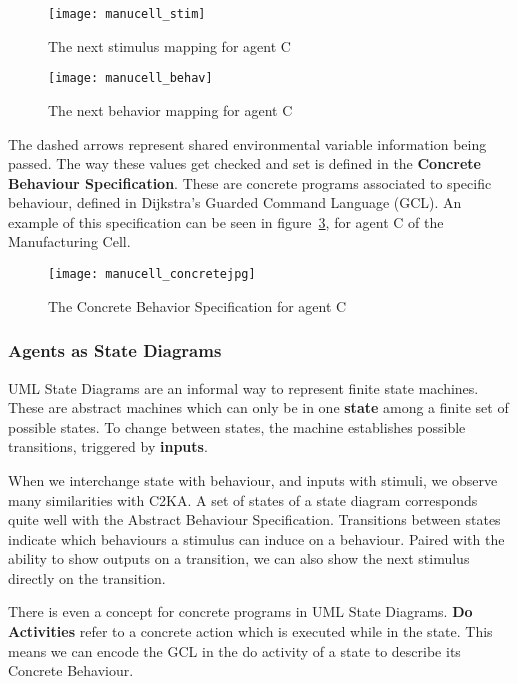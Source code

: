 \begin{figure}
    \centering
    \texttt{[image: manucell\_stim]}
    \caption{The next stimulus mapping for agent C~\cite{manu_cell}}
    \label{fig:manucell_stim}
\end{figure}
\begin{figure}
    \centering
    \texttt{[image: manucell\_behav]}
    \caption{The next behavior mapping for agent C~\cite{manu_cell}}
    \label{fig:manucell_behav}
\end{figure}

The dashed arrows represent shared environmental variable information being passed.
The way these values get checked and set is defined in the \textbf{Concrete Behaviour Specification}.
These are concrete programs associated to specific behaviour, defined in Dijkstra's Guarded Command Language (GCL).
An example of this specification can be seen in figure~\ref{fig:manu_concrete}, for agent C of the Manufacturing Cell.
\begin{figure}
    \centering
    \texttt{[image: manucell\_concretejpg]}
    \caption{The Concrete Behavior Specification for agent C~\cite{manu_cell}}
    \label{fig:manu_concrete}
\end{figure}

\subsubsection{Agents as State Diagrams}\label{subsubsec:diagram-agents}
UML State Diagrams are an informal way to represent finite state machines.
These are abstract machines which can only be in one \textbf{state} among a finite set of possible states.
To change between states, the machine establishes possible transitions, triggered by \textbf{inputs}.

When we interchange state with behaviour, and inputs with stimuli, we observe many similarities with C2KA\@.
A set of states of a state diagram corresponds quite well with the Abstract Behaviour Specification.
Transitions between states indicate which behaviours a stimulus can induce on a behaviour.
Paired with the ability to show outputs on a transition, we can also show the next stimulus directly on the transition.

There is even a concept for concrete programs in UML State Diagrams.
\textbf{Do Activities} refer to a concrete action which is executed while in the state.
This means we can encode the GCL in the do activity of a state to describe its Concrete Behaviour.

